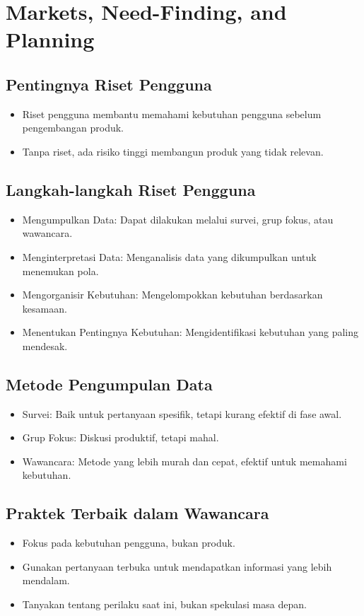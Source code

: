 \documentclass{article}
\begin{document}
\newpage

\section{Markets, Need-Finding, and Planning}
\subsection{Pentingnya Riset Pengguna}
\begin{itemize}
    \item Riset pengguna membantu memahami kebutuhan pengguna sebelum pengembangan produk.
    \item Tanpa riset, ada risiko tinggi membangun produk yang tidak relevan.
\end{itemize}

\subsection{Langkah-langkah Riset Pengguna}
\begin{itemize}
    \item Mengumpulkan Data: Dapat dilakukan melalui survei, grup fokus, atau wawancara.
    \item Menginterpretasi Data: Menganalisis data yang dikumpulkan untuk menemukan pola.
    \item Mengorganisir Kebutuhan: Mengelompokkan kebutuhan berdasarkan kesamaan.
    \item Menentukan Pentingnya Kebutuhan: Mengidentifikasi kebutuhan yang paling mendesak.
\end{itemize}

\subsection{Metode Pengumpulan Data}
\begin{itemize}
    \item Survei: Baik untuk pertanyaan spesifik, tetapi kurang efektif di fase awal.
    \item Grup Fokus: Diskusi produktif, tetapi mahal.
    \item Wawancara: Metode yang lebih murah dan cepat, efektif untuk memahami kebutuhan.
\end{itemize}

\subsection{Praktek Terbaik dalam Wawancara}
\begin{itemize}
    \item Fokus pada kebutuhan pengguna, bukan produk.
    \item Gunakan pertanyaan terbuka untuk mendapatkan informasi yang lebih mendalam.
    \item Tanyakan tentang perilaku saat ini, bukan spekulasi masa depan.
\end{itemize}
\end{document}
